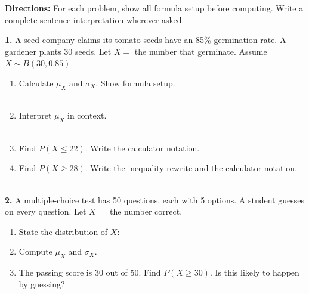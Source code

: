 \documentclass[10pt]{article}
\begin{document}
\namedateperiod

\vspace{0.1in}

\begin{practicebox}
\small
\textbf{Directions:} For each problem, show all formula setup before computing.
Write a complete-sentence interpretation wherever asked.

\vspace{10pt}
\textbf{1.} A seed company claims its tomato seeds have an 85\% germination rate.
A gardener plants 30 seeds. Let $X =$ the number that germinate.
Assume $X \sim B(30, 0.85)$.
\begin{enumerate}[label=(\alph*), leftmargin=2em, itemsep=8pt]
  \item Calculate $\mu_X$ and $\sigma_X$. Show formula setup.\\
        \writeline\\[1pt]\writeline
  \item Interpret $\mu_X$ in context.\\
        \writeline\\[1pt]\writeline
  \item Find $P(X \le 22)$. Write the calculator notation.\\
        \writeline
  \item Find $P(X \ge 28)$. Write the inequality rewrite and the calculator notation.\\
        \writeline\\[1pt]\writeline
\end{enumerate}

\vspace{8pt}
\textbf{2.} A multiple-choice test has 50 questions, each with 5 options.
A student guesses on every question. Let $X =$ the number correct.
\begin{enumerate}[label=(\alph*), leftmargin=2em, itemsep=8pt]
  \item State the distribution of $X$: \blank{4cm}
  \item Compute $\mu_X$ and $\sigma_X$.\\
        \writeline
  \item The passing score is 30 out of 50. Find $P(X \ge 30)$.
        Is this likely to happen by guessing?\\
        \writeline\\[1pt]\writeline
\end{enumerate}


\end{practicebox}
\end{document}
